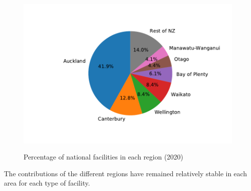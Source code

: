 \documentclass[3p, a4paper, authoryear, 11pt, fleqn, review]{elsarticle}
\begin{document}
\begin{figure}[h!]
{\begin{minipage}[t]{0.30\linewidth}
	\includegraphics[width=1\linewidth]{PieSell_2020} \medskip \\
	\end{minipage}}
\caption{Percentage of national facilities in each region (2020)}\label{fig:PercOfFac}
\end{figure}
%

The contributions of the different regions have remained relatively stable in each area for each type of facility. 
\end{document}
